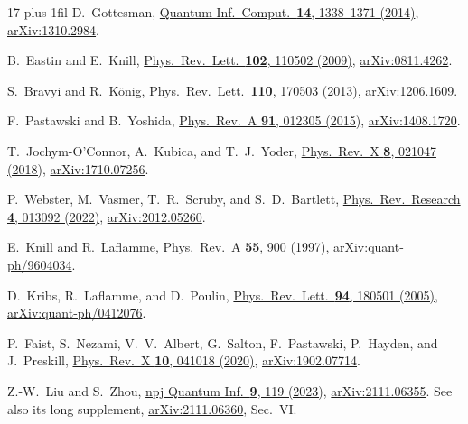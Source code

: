 \documentclass[aps,prl,reprint,notitlepage,nofootinbib,nobibnotes]{revtex4-2}
\begin{document}
\begin{thebibliography}{17}
\rightskip=0pt plus 1fil\relax
{}
D.~Gottesman,
\href{https://doi.org/10.26421/QIC14.15-16-5}
{Quantum Inf.\ Comput.\ \textbf{14}, 1338--1371 (2014)},
\href{https://arxiv.org/abs/1310.2984}{arXiv:1310.2984}.

B.~Eastin and E.~Knill,
\href{https://doi.org/10.1103/PhysRevLett.102.110502}
{Phys.\ Rev.\ Lett.\ \textbf{102}, 110502 (2009)},
\href{https://arxiv.org/abs/0811.4262}{arXiv:0811.4262}.

S.~Bravyi and R.~K\"onig,
\href{https://doi.org/10.1103/PhysRevLett.110.170503}
{Phys.\ Rev.\ Lett.\ \textbf{110}, 170503 (2013)},
\href{https://arxiv.org/abs/1206.1609}{arXiv:1206.1609}.

F.~Pastawski and B.~Yoshida,
\href{https://doi.org/10.1103/PhysRevA.91.012305}
{Phys.\ Rev.\ A \textbf{91}, 012305 (2015)},
\href{https://arxiv.org/abs/1408.1720}{arXiv:1408.1720}.

T.~Jochym-O'Connor, A.~Kubica, and T.~J.~Yoder,
\href{https://doi.org/10.1103/PhysRevX.8.021047}
{Phys.\ Rev.\ X \textbf{8}, 021047 (2018)},
\href{https://arxiv.org/abs/1710.07256}{arXiv:1710.07256}.

P.~Webster, M.~Vasmer, T.~R.~Scruby, and S.~D.~Bartlett,
\href{https://doi.org/10.1103/PhysRevResearch.4.013092}
{Phys.\ Rev.\ Research \textbf{4}, 013092 (2022)},
\href{https://arxiv.org/abs/2012.05260}{arXiv:2012.05260}.

E.~Knill and R.~Laflamme,
\href{https://doi.org/10.1103/PhysRevA.55.900}
{Phys.\ Rev.\ A \textbf{55}, 900 (1997)},
\href{https://arxiv.org/abs/quant-ph/9604034}{arXiv:quant-ph/9604034}.

D.~Kribs, R.~Laflamme, and D.~Poulin,
\href{https://doi.org/10.1103/PhysRevLett.94.180501}
{Phys.\ Rev.\ Lett.\ \textbf{94}, 180501 (2005)},
\href{https://arxiv.org/abs/quant-ph/0412076}{arXiv:quant-ph/0412076}.

P.~Faist, S.~Nezami, V.~V.~Albert, G.~Salton, F.~Pastawski,
P.~Hayden, and J.~Preskill,
\href{https://doi.org/10.1103/PhysRevX.10.041018}
{Phys.\ Rev.\ X \textbf{10}, 041018 (2020)},
\href{https://arxiv.org/abs/1902.07714}{arXiv:1902.07714}.

Z.-W.~Liu and S.~Zhou,
\href{https://doi.org/10.1038/s41534-023-00788-4}
{npj Quantum Inf.\ \textbf{9}, 119 (2023)},
\href{https://arxiv.org/abs/2111.06355}{arXiv:2111.06355}.
See also its long supplement,
\href{https://arxiv.org/abs/2111.06360}{arXiv:2111.06360}, Sec.~VI.


\end{thebibliography}
\end{document}
